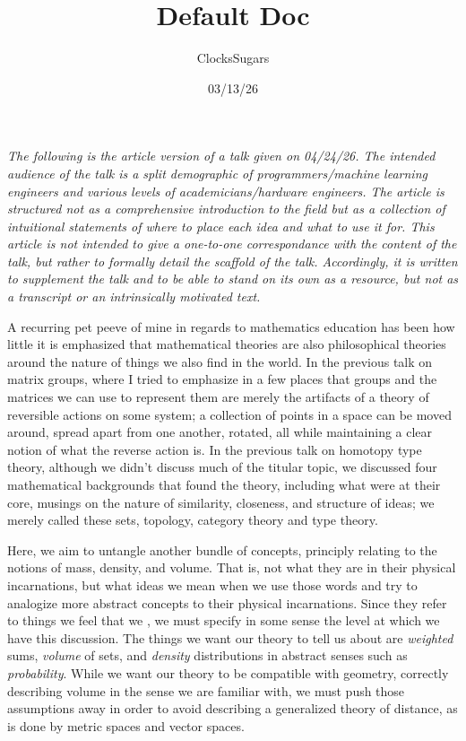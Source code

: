 \documentclass[11pt]{article}
\title{\textbf{Default Doc}}
\author{ClocksSugars}
\date{03/13/26}
\begin{document}
\emph{The following is the article version of a talk given on 04/24/26. The intended audience of the talk is a split demographic of programmers/machine learning engineers and various levels of academicians/hardware engineers. The article is structured not as a comprehensive introduction to the field but as a collection of intuitional statements of where to place each idea and what to use it for. This article is not intended to give a one-to-one correspondance with the content of the talk, but rather to formally detail the scaffold of the talk. Accordingly, it is written to supplement the talk and to be able to stand on its own as a resource, but not as a transcript or an intrinsically motivated text.}

A recurring pet peeve of mine in regards to mathematics education has been how little it is emphasized that mathematical theories are also philosophical theories around the nature of things we also find in the world. In the previous talk on matrix groups, where I tried to emphasize in a few places that groups and the matrices we can use to represent them are merely the artifacts of a theory of reversible actions on some system; a collection of points in a space can be moved around, spread apart from one another, rotated, all while maintaining a clear notion of what the reverse action is. In the previous talk on homotopy type theory, although we didn't discuss much of the titular topic, we discussed four mathematical backgrounds that found the theory, including what were at their core, musings on the nature of similarity, closeness, and structure of ideas; we merely called these sets, topology, category theory and type theory.

Here, we aim to untangle another bundle of concepts, principly relating to the notions of mass, density, and volume. That is, not what they are in their physical incarnations, but what ideas we mean when we use those words and try to analogize more abstract concepts to their physical incarnations. Since they refer to things we feel that we , we must specify in some sense the level at which we have this discussion. The things we want our theory to tell us about are \emph{weighted} sums, \emph{volume} of sets, and \emph{density} distributions in abstract senses such as \emph{probability}. While we want our theory to be compatible with geometry, correctly describing volume in the sense we are familiar with, we must push those assumptions away in order to avoid describing a generalized theory of distance, as is done by metric spaces and vector spaces.
\end{document}
